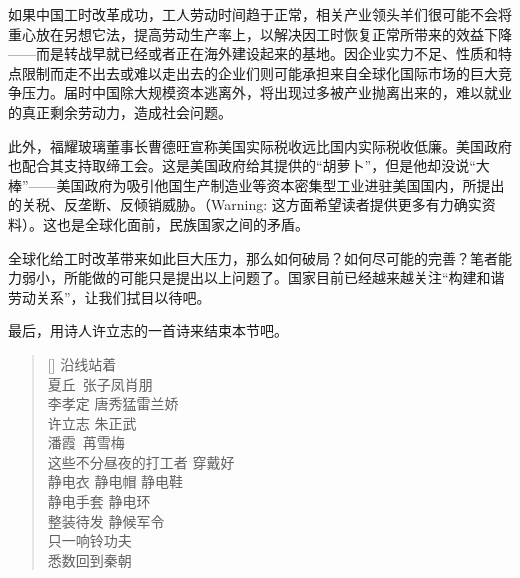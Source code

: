 如果中国工时改革成功，工人劳动时间趋于正常，相关产业领头羊们很可能不会将重心放在另想它法，提高劳动生产率上，以解决因工时恢复正常所带来的效益下降——而是转战早就已经或者正在海外建设起来的基地。因企业实力不足、性质和特点限制而走不出去或难以走出去的企业们则可能承担来自全球化国际市场的巨大竞争压力。届时中国除大规模资本逃离外，将出现过多被产业抛离出来的，难以就业的真正剩余劳动力，造成社会问题。

此外，福耀玻璃董事长曹德旺宣称美国实际税收远比国内实际税收低廉。美国政府也配合其支持取缔工会。这是美国政府给其提供的“胡萝卜”，但是他却没说“大棒”——美国政府为吸引他国生产制造业等资本密集型工业进驻美国国内，所提出的关税、反垄断、反倾销威胁。（Warning: 这方面希望读者提供更多有力确实资料）。这也是全球化面前，民族国家之间的矛盾。

全球化给工时改革带来如此巨大压力，那么如何破局？如何尽可能的完善？笔者能力弱小，所能做的可能只是提出以上问题了。国家目前已经越来越关注“构建和谐劳动关系”，让我们拭目以待吧。

最后，用诗人许立志的一首诗来结束本节吧。

 \settowidth{\versewidth}{Than Tycho Brahe， or Erra Pater:}
\begin{verse}[\versewidth] \kaishu
  沿线站着\\
  \qquad 夏丘\ \qquad \quad 张子凤\qquad 肖朋\\ \qquad 李孝定 \qquad 唐秀猛\qquad 雷兰娇\\ \qquad 许立志 \qquad 朱正武\qquad \\ \qquad 潘霞\ \qquad \quad 苒雪梅\\这些不分昼夜的打工者 \qquad 穿戴好\\ \qquad 静电衣 \qquad 静电帽 \quad 静电鞋\\ \qquad 静电手套 \quad 静电环 \\整装待发 \quad 静候军令\\只一响铃功夫\\悉数回到秦朝
\end{verse}
\newcommand{\attrib}[1]{\nopagebreak{\raggedleft\small #1\par}} \attrib{许立志 (1990--2014)}



